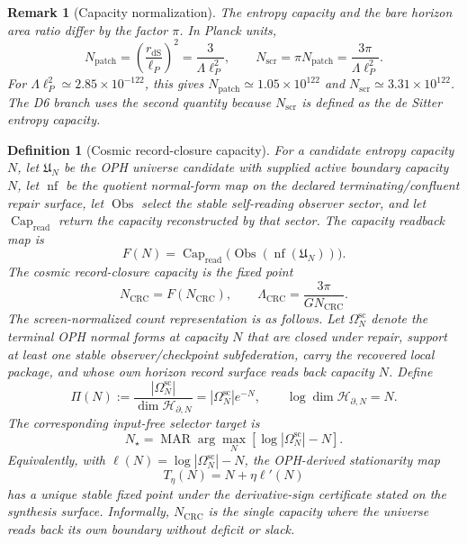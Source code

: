 \documentclass[11pt]{article}
\newtheorem{definition}[theorem]{Definition}
\newtheorem{remark}[theorem]{Remark}
\begin{document}
\begin{remark}[Capacity normalization]\label{rem:lambda-capacity-normalization}
The entropy capacity and the bare horizon area ratio differ by the factor \(\pi\). In Planck units,
\[
N_{\mathrm{patch}}=\left(\frac{r_{\mathrm{dS}}}{\ell_P}\right)^2
=\frac{3}{\Lambda\ell_P^2},
\qquad
N_{\mathrm{scr}}=\pi N_{\mathrm{patch}}
=\frac{3\pi}{\Lambda\ell_P^2}.
\]
For \(\Lambda\ell_P^2\simeq2.85\times10^{-122}\), this gives
\(N_{\mathrm{patch}}\simeq1.05\times10^{122}\) and
\(N_{\mathrm{scr}}\simeq3.31\times10^{122}\). The D6 branch uses the second quantity because
\(N_{\mathrm{scr}}\) is defined as the de Sitter entropy capacity.
\end{remark}

\begin{definition}[Cosmic record-closure capacity]\label{def:self-closure-density}
For a candidate entropy capacity \(N\), let \(\mathfrak U_N\) be the OPH universe candidate with
supplied active boundary capacity \(N\), let \(\operatorname{nf}\) be the quotient normal-form map
on the declared terminating/confluent repair surface, let \(\operatorname{Obs}\) select the stable
self-reading observer sector, and let \(\operatorname{Cap}_{\mathrm{read}}\) return the capacity
reconstructed by that sector. The capacity readback map is
\[
F(N)=
\operatorname{Cap}_{\mathrm{read}}
\bigl(\operatorname{Obs}(\operatorname{nf}(\mathfrak U_N))\bigr).
\]
The cosmic record-closure capacity is the fixed point
\[
N_{\mathrm{CRC}}=F(N_{\mathrm{CRC}}),
\qquad
\Lambda_{\mathrm{CRC}}=\frac{3\pi}{G N_{\mathrm{CRC}}}.
\]
The screen-normalized count representation is as follows. Let \(\Omega^{\mathrm{sc}}_N\) denote
the terminal OPH normal forms at capacity \(N\) that are closed under repair, support at least one
stable observer/checkpoint subfederation, carry the recovered local package, and whose own horizon
record surface reads back capacity \(N\). Define
\[
\Pi(N):=\frac{|\Omega^{\mathrm{sc}}_N|}{\dim \mathcal H_{\partial,N}}
=|\Omega^{\mathrm{sc}}_N|e^{-N},
\qquad
\log\dim \mathcal H_{\partial,N}=N.
\]
The corresponding input-free selector target is
\[
N_\star=\operatorname{MAR}\arg\max_N\left[\log|\Omega^{\mathrm{sc}}_N|-N\right].
\]
Equivalently, with \(\ell(N)=\log|\Omega^{\mathrm{sc}}_N|-N\), the OPH-derived stationarity map
\[
T_\eta(N)=N+\eta\ell'(N)
\]
has a unique stable fixed point under the derivative-sign certificate stated on the synthesis
surface. Informally, \(N_{\mathrm{CRC}}\) is the single capacity where the universe reads back its
own boundary without deficit or slack.
\end{definition}
\end{document}
